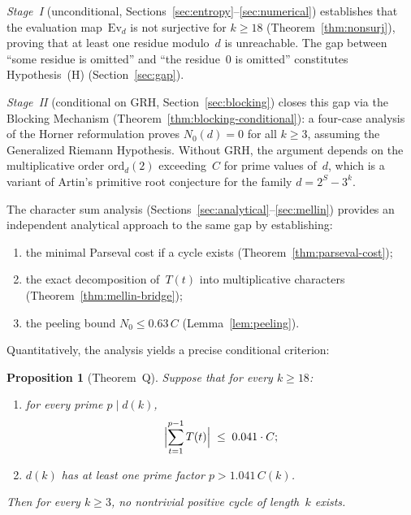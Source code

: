 \documentclass[12pt, a4paper]{amsart}
\theoremstyle{plain}
\newtheorem{proposition}[theorem]{Proposition}
\theoremstyle{definition}
\theoremstyle{remark}
\newcommand{\Ev}{\mathrm{Ev}}
\newcommand{\ord}{\mathrm{ord}}
\begin{document}
\emph{Stage~I} (unconditional,
Sections~\ref{sec:entropy}--\ref{sec:numerical})
establishes that the evaluation map~$\Ev_d$ is not surjective
for $k \geq 18$ (Theorem~\ref{thm:nonsurj}), proving that
at least one residue modulo~$d$ is unreachable.
The gap between ``some residue is omitted'' and ``the
residue~$0$ is omitted'' constitutes Hypothesis~(H)
(Section~\ref{sec:gap}).

\emph{Stage~II} (conditional on GRH,
Section~\ref{sec:blocking}) closes this gap via the
Blocking Mechanism (Theorem~\ref{thm:blocking-conditional}):
a four-case analysis of the Horner reformulation proves
$N_0(d) = 0$ for all $k \geq 3$, assuming the Generalized
Riemann Hypothesis.
Without GRH, the argument depends on the multiplicative
order $\ord_d(2)$ exceeding~$C$ for prime values of~$d$,
which is a variant of Artin's primitive root conjecture for
the family $d = 2^S - 3^k$.

The character sum analysis
(Sections~\ref{sec:analytical}--\ref{sec:mellin}) provides
an independent analytical approach to the same gap by
establishing:
\begin{enumerate}[label=(\roman*)]
  \item the minimal Parseval cost if a cycle exists
    (Theorem~\ref{thm:parseval-cost});
  \item the exact decomposition of~$T(t)$ into multiplicative
    characters (Theorem~\ref{thm:mellin-bridge});
  \item the peeling bound $N_0 \leq 0.63\,C$
    (Lemma~\ref{lem:peeling}).
\end{enumerate}

Quantitatively, the analysis yields a precise conditional
criterion:

\begin{proposition}[Theorem~Q]\label{prop:theorem-Q}
  Suppose that for every $k \geq 18$:
  \begin{enumerate}[label=\textup{(\arabic*)}]
    \item for every prime $p \mid d(k)$,
    \begin{equation}\label{eq:condition-Q}
      \Bigl|\sum_{t=1}^{p-1} T(t)\Bigr|
      \;\leq\; 0.041 \cdot C;
    \end{equation}
    \item $d(k)$ has at least one prime factor
    $p > 1.041\,C(k)$.
  \end{enumerate}
  Then for every $k \geq 3$, no nontrivial positive cycle
  of length~$k$ exists.
\end{proposition}
\end{document}
